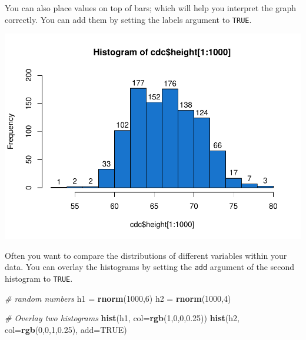 \documentclass[
]{book}
\newenvironment{Shaded}{\begin{snugshade}}{\end{snugshade}}
\newcommand{\CommentTok}[1]{\textcolor[rgb]{0.56,0.35,0.01}{\textit{#1}}}
\newcommand{\DataTypeTok}[1]{\textcolor[rgb]{0.13,0.29,0.53}{#1}}
\newcommand{\DecValTok}[1]{\textcolor[rgb]{0.00,0.00,0.81}{#1}}
\newcommand{\FloatTok}[1]{\textcolor[rgb]{0.00,0.00,0.81}{#1}}
\newcommand{\KeywordTok}[1]{\textcolor[rgb]{0.13,0.29,0.53}{\textbf{#1}}}
\newcommand{\NormalTok}[1]{#1}
\newcommand{\OperatorTok}[1]{\textcolor[rgb]{0.81,0.36,0.00}{\textbf{#1}}}
\newcommand{\OtherTok}[1]{\textcolor[rgb]{0.56,0.35,0.01}{#1}}
\newcommand{\StringTok}[1]{\textcolor[rgb]{0.31,0.60,0.02}{#1}}
\begin{document}
You can also place values on top of bars; which will help you interpret the graph correctly. You can add them by setting the labels argument to \texttt{TRUE}.

\begin{Shaded}
\end{Shaded}

\includegraphics{_main_files/figure-latex/unnamed-chunk-131-1.pdf}

Often you want to compare the distributions of different variables within your data. You can overlay the histograms by setting the \texttt{add} argument of the second histogram to \texttt{TRUE}.

\begin{Shaded}
\begin{Highlighting}[]
\CommentTok{# random numbers}
\NormalTok{h1 =}\StringTok{ }\KeywordTok{rnorm}\NormalTok{(}\DecValTok{1000}\NormalTok{,}\DecValTok{6}\NormalTok{)}
\NormalTok{h2 =}\StringTok{ }\KeywordTok{rnorm}\NormalTok{(}\DecValTok{1000}\NormalTok{,}\DecValTok{4}\NormalTok{)}

\CommentTok{# Overlay two histograms}
\KeywordTok{hist}\NormalTok{(h1,}
     \DataTypeTok{col=}\KeywordTok{rgb}\NormalTok{(}\DecValTok{1}\NormalTok{,}\DecValTok{0}\NormalTok{,}\DecValTok{0}\NormalTok{,}\FloatTok{0.25}\NormalTok{))}
\KeywordTok{hist}\NormalTok{(h2,}
     \DataTypeTok{col=}\KeywordTok{rgb}\NormalTok{(}\DecValTok{0}\NormalTok{,}\DecValTok{0}\NormalTok{,}\DecValTok{1}\NormalTok{,}\FloatTok{0.25}\NormalTok{),}
     \DataTypeTok{add=}\OtherTok{TRUE}\NormalTok{)}
\end{Highlighting}
\end{Shaded}
\end{document}
